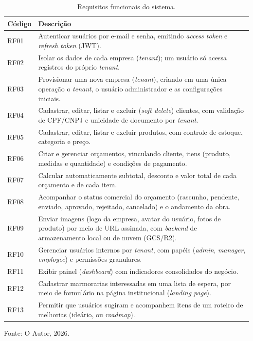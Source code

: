 \begin{table}[H]
  \centering
  \caption{Requisitos funcionais do sistema.}
  \label{tab:requisitos-funcionais}
  \begin{tabular}{p{1.3cm}p{11.4cm}}
    \hline
    \textbf{Código} & \textbf{Descrição} \\
    \hline
    RF01 & Autenticar usuários por e-mail e senha, emitindo \textit{access token} e \textit{refresh token} (JWT). \\
    RF02 & Isolar os dados de cada empresa (\textit{tenant}); um usuário só acessa registros do próprio \textit{tenant}. \\
    RF03 & Provisionar uma nova empresa (\textit{tenant}), criando em uma única operação o \textit{tenant}, o usuário administrador e as configurações iniciais. \\
    RF04 & Cadastrar, editar, listar e excluir (\textit{soft delete}) clientes, com validação de CPF/CNPJ e unicidade de documento por \textit{tenant}. \\
    RF05 & Cadastrar, editar, listar e excluir produtos, com controle de estoque, categoria e preço. \\
    RF06 & Criar e gerenciar orçamentos, vinculando cliente, itens (produto, medidas e quantidade) e condições de pagamento. \\
    RF07 & Calcular automaticamente subtotal, desconto e valor total de cada orçamento e de cada item. \\
    RF08 & Acompanhar o status comercial do orçamento (rascunho, pendente, enviado, aprovado, rejeitado, cancelado) e o andamento da obra. \\
    RF09 & Enviar imagens (logo da empresa, avatar do usuário, fotos de produto) por meio de URL assinada, com \textit{backend} de armazenamento local ou de nuvem (GCS/R2). \\
    RF10 & Gerenciar usuários internos por \textit{tenant}, com papéis (\textit{admin}, \textit{manager}, \textit{employee}) e permissões granulares. \\
    RF11 & Exibir painel (\textit{dashboard}) com indicadores consolidados do negócio. \\
    RF12 & Cadastrar marmorarias interessadas em uma lista de espera, por meio de formulário na página institucional (\textit{landing page}). \\
    RF13 & Permitir que usuários sugiram e acompanhem itens de um roteiro de melhorias (ideário, ou \textit{roadmap}). \\
    \hline
  \end{tabular}
  \begin{minipage}{0.95\textwidth}
    \vspace{0.3em}
    {\small Fonte: O Autor, 2026.}
  \end{minipage}
\end{table}

